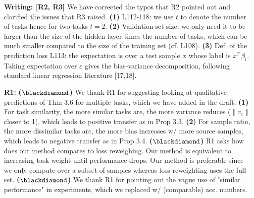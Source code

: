 \documentclass{article}
\begin{document}
\vspace{-0.025in}
\textbf{Writing: [R2, R3]}
We have corrected the typos that R2 pointed out and clarified the issues that R3 raised.
\textbf{(1)} L112-118: we use $t$ to denote the number of tasks hence for two tasks $t = 2$.
\textbf{(2)} Validation set size: we only need it to be larger than the size of the hidden layer times the number of tasks, which can be much smaller compared to the size of the training set (cf. L108).
\textbf{(3)} Def. of the prediction loss L113: the expectation is over a test sample $x$ whose label is $x^{\top}\beta_t$.
Taking expectation over $\varepsilon$ gives  the bias-variance decomposition, following standard linear regression literature [17,18].

\vspace{-0.025in}
\textbf{R1:}
\textbf{($\blackdiamond$)} We thank R1 for suggesting looking at qualitative predictions of Thm 3.6 for multiple tasks, which we have added in the  draft.
\textbf{(1)} For task similarity, the more similar tasks are, the more variance reduces ($\|{v_t}\|$ closer to 1), which leads to positive transfer as in Prop 3.3.
\textbf{(2)} For sample ratio, the more dissimilar tasks are, the more bias increases w/ more source samples, which leads to negative transfer as in Prop 3.4.
\textbf{($\blackdiamond$)} R1 asks how does our method compares to loss reweighing.
Our method is equivalent to increasing task weight until performance drops.
Our method is preferable since we only compute over a subset of samples whereas loss reweighting uses the full set.
\textbf{($\blackdiamond$)} We thank R1 for pointing out the vague use of "similar performance" in experiments, which we replaced w/ (comparable) acc. numbers. %
\end{document}
